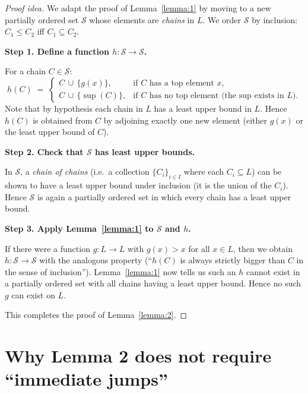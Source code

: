 \documentclass[12pt]{article}
\theoremstyle{definition} %
\theoremstyle{plain} %
\begin{document}
    \begin{proof}[Proof idea]
    We adapt the proof of Lemma~\ref{lemma:1} by moving to a new 
    partially ordered set $\mathcal{S}$ whose elements are \emph{chains} in $L$.  
    We order $\mathcal{S}$ by inclusion: $C_1 \le C_2$ iff $C_1 \subseteq C_2$.  
    
    \medskip
    
    \textbf{Step 1. Define a function $h: \mathcal{S} \to \mathcal{S}$.}
    
    For a chain $C \in \mathcal{S}$:
    \[
       h(C) \;=\; 
       \begin{cases}
       C \,\cup\, \{g(x)\}, & \text{if $C$ has a top element $x$,}\\
       C \,\cup\, \{\sup(C)\}, & \text{if $C$ has no top element (the sup exists in $L$).}
       \end{cases}
    \]
    Note that by hypothesis each chain in $L$ has a least upper bound in $L$.  
    Hence $h(C)$ is obtained from $C$ by adjoining exactly one new element 
    (either $g(x)$ or the least upper bound of $C$).
    
    \medskip
    
    \textbf{Step 2. Check that $\mathcal{S}$ has least upper bounds.}
    
    In $\mathcal{S}$, a \emph{chain of chains} (i.e.\ a collection 
    $\{C_i\}_{i \in I}$ where each $C_i \subseteq L$) can be shown 
    to have a least upper bound under inclusion (it is the union of the $C_i$).  
    Hence $\mathcal{S}$ is again a partially ordered set in which every chain 
    has a least upper bound.
    
    \medskip
    
    \textbf{Step 3. Apply Lemma~\ref{lemma:1} to $\mathcal{S}$ and $h$.}
    
    If there were a function $g : L \to L$ with $g(x) > x$ for all $x \in L$, 
    then we obtain $h : \mathcal{S} \to \mathcal{S}$ with the analogous 
    property (``$h(C)$ is always strictly bigger than $C$ in the sense of 
    inclusion'').  Lemma~\ref{lemma:1} now tells us such an $h$ cannot exist 
    in a partially ordered set with all chains having a least upper bound.  
    Hence no such $g$ can exist on $L$.  
    
    This completes the proof of Lemma~\ref{lemma:2}.
    \end{proof}

    \section*{Why Lemma 2 does not require ``immediate jumps''}
\end{document}
